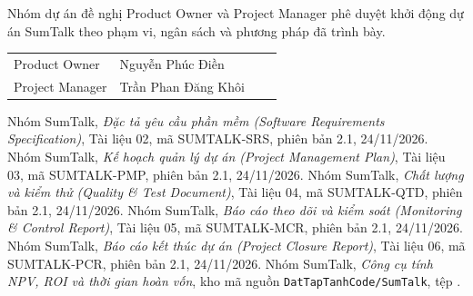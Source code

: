 \documentclass[12pt,a4paper]{report}
\begin{document}
Nhóm dự án đề nghị Product Owner và Project Manager phê duyệt khởi động dự án SumTalk theo phạm vi, ngân sách và
phương pháp đã trình bày.

\begin{table}[H]
  \centering
  \renewcommand{\arraystretch}{2.4}
  \begin{tabularx}{\linewidth}{@{}P{3.6cm}LP{3.2cm}P{2.6cm}@{}}
    \toprule
     &  &  &  \\
    \midrule
    Product Owner & Nguyễn Phúc Điền & & \\
    Project Manager & Trần Phan Đăng Khôi & & \\
    \bottomrule
  \end{tabularx}
\end{table}

\begin{thebibliography}{9}
   Nhóm SumTalk, \emph{Đặc tả yêu cầu phần mềm (Software Requirements Specification)},
    Tài liệu 02, mã SUMTALK-SRS, phiên bản 2.1, 24/11/2026.
   Nhóm SumTalk, \emph{Kế hoạch quản lý dự án (Project Management Plan)}, Tài liệu 03,
    mã SUMTALK-PMP, phiên bản 2.1, 24/11/2026.
   Nhóm SumTalk, \emph{Chất lượng và kiểm thử (Quality \& Test Document)}, Tài liệu 04,
    mã SUMTALK-QTD, phiên bản 2.1, 24/11/2026.
   Nhóm SumTalk, \emph{Báo cáo theo dõi và kiểm soát (Monitoring \& Control Report)}, Tài liệu 05,
    mã SUMTALK-MCR, phiên bản 2.1, 24/11/2026.
   Nhóm SumTalk, \emph{Báo cáo kết thúc dự án (Project Closure Report)}, Tài liệu 06,
    mã SUMTALK-PCR, phiên bản 2.1, 24/11/2026.
   Nhóm SumTalk, \emph{Công cụ tính NPV, ROI và thời gian hoàn vốn},
    kho mã nguồn \texttt{DatTapTanhCode/SumTalk}, tệp .
\end{thebibliography}
\end{document}
